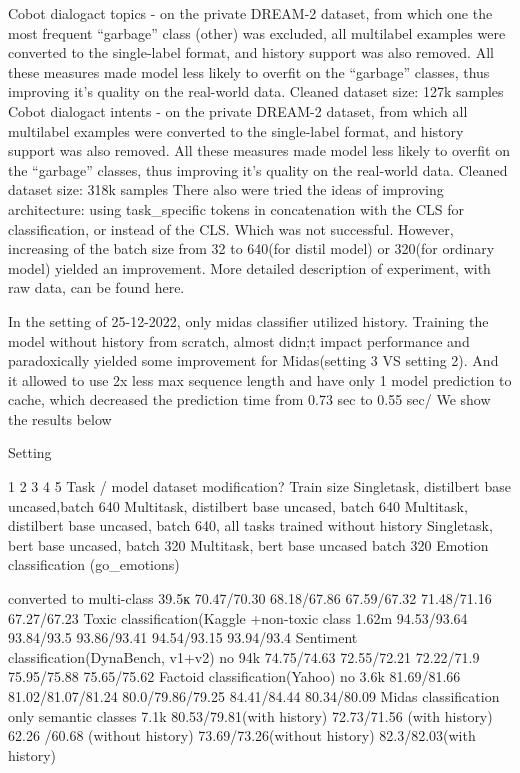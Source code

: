 Cobot dialogact topics - on the private DREAM-2 dataset, from which one the most frequent “garbage” class (other) was excluded, all multilabel examples were converted to the single-label format, and history support was also removed. All these measures made model less likely to overfit on the “garbage” classes, thus improving it’s quality on the real-world data. Cleaned dataset size: 127k samples
Cobot dialogact intents - on the private DREAM-2 dataset, from which all multilabel examples were converted to the single-label format, and history support was also removed. All these measures made model less likely to overfit on the “garbage” classes, thus improving it’s quality on the real-world data. Cleaned dataset size: 318k samples
There also were tried the ideas of improving architecture: using task_specific tokens in concatenation with the CLS for classification, or instead of the CLS. Which was not successful. However, increasing of the batch size from 32 to 640(for distil model) or 320(for ordinary model) yielded an improvement. 
More detailed description of experiment, with raw data, can be found here.

In the setting of 25-12-2022, only midas classifier utilized history. Training the model without history from scratch, almost didn;t impact performance and paradoxically yielded some improvement for Midas(setting 3 VS setting 2). And it allowed to use 2x less max sequence length and have only 1 model prediction to cache, which decreased the prediction time from 0.73 sec to 0.55 sec/
We show the results below

Setting




1
2
3
4
5
Task / model
dataset modification?
Train size
Singletask, distilbert base uncased,batch 640
Multitask, distilbert base uncased, batch 640
Multitask, distilbert base uncased, batch 640, all tasks trained without history
Singletask, bert base uncased, batch 320
Multitask, bert base uncased
batch 320
Emotion classification (go_emotions)


converted to multi-class
39.5к
70.47/70.30
68.18/67.86
67.59/67.32
71.48/71.16
67.27/67.23
Toxic classification(Kaggle
+non-toxic class
1.62m
94.53/93.64
93.84/93.5
93.86/93.41
94.54/93.15
93.94/93.4
Sentiment classification(DynaBench, v1+v2)
no
94k
74.75/74.63
72.55/72.21
72.22/71.9
75.95/75.88
75.65/75.62
Factoid classification(Yahoo)
no
3.6k
81.69/81.66
81.02/81.07/81.24
80.0/79.86/79.25
84.41/84.44
80.34/80.09
Midas classification
only semantic classes
7.1k
80.53/79.81(with history)
72.73/71.56 (with history)
62.26 /60.68 (without history)
73.69/73.26(without history)
82.3/82.03(with history)



